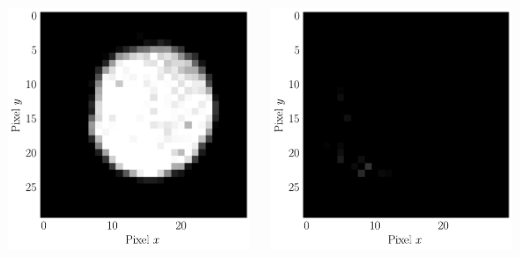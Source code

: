 \begin{frame}
\begin{columns}
\begin{column}{0.45\textwidth}
\begin{columns}
\begin{column}{0.45\textwidth}
          \includegraphics[width=\textwidth]{04_Test/fig/fig000_IRMA_15keV_svg-tex.pdf}
        \end{column}
        \begin{column}{0.45\textwidth}
          \includegraphics[width=\textwidth]{04_Test/fig/fig000_IRMA_12keV_svg-tex.pdf}

\end{column}
\end{columns}
\end{column}
\end{columns}
\end{frame}
